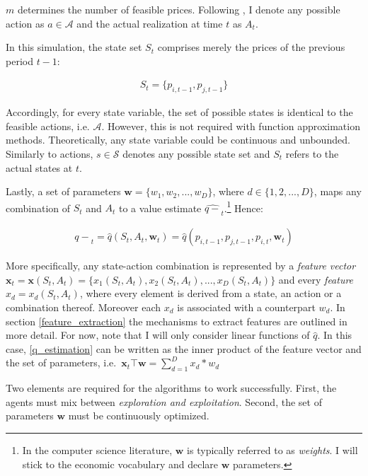 $m$ determines the number of feasible prices. Following \textcite{sutton_reinforcement_2018}, I denote any possible action as $a \in \mathcal{A}$ and the actual realization at time $t$ as $A_t$.

In this simulation, the state set $S_t$ comprises merely the prices of the previous period $t-1$:

\begin{gather}
S_t = \{ p_{i, t-1}, p_{j, t-1} \}
\end{gather}


Accordingly, for every state variable, the set of possible states is identical to the feasible actions, i.e. $\mathcal{A}$. However, this is not required with function approximation methods. Theoretically, any state variable could be continuous and unbounded. Similarly to actions, $s \in \mathcal{S}$ denotes any possible state set and $S_t$ refers to the actual states at $t$.






Lastly, a set of parameters $\boldsymbol{w} = \{w_1, w_2, ..., w_D\}$, where $d \in \{1, 2, ..., D\}$, maps any combination of $S_t$ and $A_t$ to a value estimate $\hat{q-}_t$.\footnote{In the computer science literature, $\boldsymbol{w}$ is typically referred to as \emph{weights}. I will stick to the economic vocabulary and declare $\boldsymbol{w}$ parameters.} Hence:

\begin{gather}\label{q_estimation}
	\hat{q-}_t = \hat{q}(S_t,A_t,\boldsymbol{w}_t) = \hat{q}(p_{i, t-1}, p_{j, t-1}, p_{i, t}, \boldsymbol{w}_t)
\end{gather}

More specifically, any state-action combination is represented by a \emph{feature vector} $\boldsymbol{x}_t = \boldsymbol{x}(S_t, A_t) = \{x_1(S_t, A_t), x_2(S_t, A_t), ..., x_D(S_t, A_t)\}$ and every \emph{feature} $x_d = x_d(S_t, A_t)$, where every element is derived from a state, an action or a combination thereof. Moreover each $x_d$ is associated with a counterpart $w_d$. In section \ref{feature_extraction} the mechanisms to extract features are outlined in more detail. For now, note that I will only consider linear functions of $\hat{q}$. In this case, \autoref{q_estimation} can be written as the inner product of the feature vector and the set of parameters, i.e.\ $\boldsymbol{x}_t \top \boldsymbol{w} = \sum_{d=1}^{D} x_d * w_d$

Two elements are required for the algorithms to work successfully. First, the agents must mix between \emph{exploration and exploitation}. Second, the set of parameters $\boldsymbol{w}$ must be continuously optimized.

